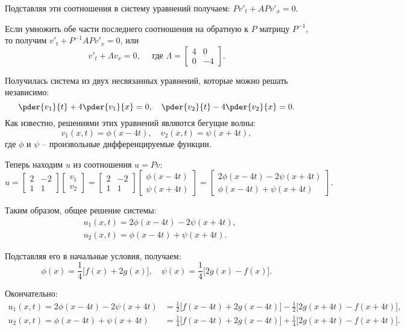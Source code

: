 Подставляя эти соотношения в систему уравнений получаем: \( Pv'_t + APv'_x = 0 \).

Если умножить обе части последнего соотношения на обратную к \( P \) матрицу
\( P^{-1} \), то получим \( v'_t + P^{-1}APv'_x = 0 \), или
\[
    v'_t + \Lambda v_x = 0,\quad \text{ где }
    \Lambda = \begin{bmatrix} 4 & 0 \\[-.5em] 0 & -4 \end{bmatrix}.
\]

Получилась система из двух несвязанных уравнений, которые можно решать
независимо:
\[
    \pder{v_1}{t} + 4\pder{v_1}{x} = 0,\quad \pder{v_2}{t} - 4\pder{v_2}{x} = 0.
\]
Как известно, решениями этих уравнений являются бегущие волны:
\[
    v_1(x, t) = \phi(x - 4t),\quad v_2(x, t) = \psi(x + 4t),
\]
где \( \phi \) и \( \psi \) -- произвольные дифференцируемые функции.

Теперь находим \( u \) из соотношения \( u = Pv \):
\[
    u = \begin{bmatrix} 2 & -2 \\[-.5em] 1 & 1 \end{bmatrix}
    \begin{bmatrix} v_1 \\[-.5em] v_2 \end{bmatrix} =
    \begin{bmatrix} 2 & -2 \\[-.5em] 1 & 1 \end{bmatrix}
    \begin{bmatrix} \phi(x - 4t) \\[-.5em] \psi(x + 4t) \end{bmatrix} =
    \begin{bmatrix} 2\phi(x-4t) - 2\psi(x+4t) \\[-.5em]
    \phi(x-4t) + \psi(x+4t) \end{bmatrix}.
\]

Таким образом, общее решение системы:
\begin{align*}
    & u_1(x, t) = 2\phi(x-4t) - 2\psi(x+4t), \\
    & u_2(x, t) = \phi(x-4t) + \psi(x+4t).
\end{align*}

Подставляя его в начальные условия, получаем:
\[
    \phi(x) = \frac{1}{4}\bigl[f(x) + 2g(x)\bigr], \quad
    \psi(x) = \frac{1}{4}\bigl[2g(x) - f(x)\bigr].
\]

Окончательно:
\begin{align*}
    u_1(x, t) = 2\phi(x-4t) - 2\psi(x+4t) &= \frac{1}{2}\bigl[f(x-4t) + 2g(x-4t)
    \bigr] - \frac{1}{2}\bigl[2g(x+4t) - f(x+4t)\bigr], \\
    u_2(x, t) = \phi(x-4t) + \psi(x+4t) &= \frac{1}{4}\bigl[f(x-4t) + 2g(x-4t)
    \bigr] + \frac{1}{4}\bigl[2g(x+4t) - f(x+4t)\bigr]. \\
\end{align*}

\newpage

